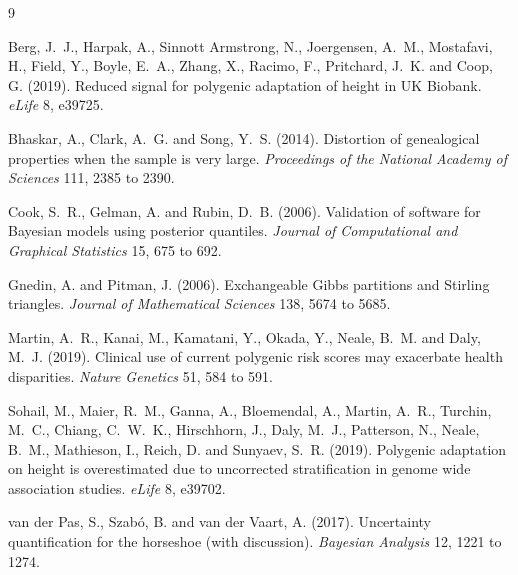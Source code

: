 \begin{thebibliography}{9}

Berg, J.~J., Harpak, A., Sinnott Armstrong, N., Joergensen, A.~M., Mostafavi, H., Field, Y.,
Boyle, E.~A., Zhang, X., Racimo, F., Pritchard, J.~K. and Coop, G. (2019). Reduced signal for
polygenic adaptation of height in UK Biobank. \emph{eLife} 8, e39725.

Bhaskar, A., Clark, A.~G. and Song, Y.~S. (2014). Distortion of genealogical properties when the
sample is very large. \emph{Proceedings of the National Academy of Sciences} 111, 2385 to 2390.

Cook, S.~R., Gelman, A. and Rubin, D.~B. (2006). Validation of software for Bayesian models using
posterior quantiles. \emph{Journal of Computational and Graphical Statistics} 15, 675 to 692.

Gnedin, A. and Pitman, J. (2006). Exchangeable Gibbs partitions and Stirling triangles.
\emph{Journal of Mathematical Sciences} 138, 5674 to 5685.

Martin, A.~R., Kanai, M., Kamatani, Y., Okada, Y., Neale, B.~M. and Daly, M.~J. (2019). Clinical
use of current polygenic risk scores may exacerbate health disparities. \emph{Nature Genetics} 51,
584 to 591.

Sohail, M., Maier, R.~M., Ganna, A., Bloemendal, A., Martin, A.~R., Turchin, M.~C., Chiang, C.~W.~K., Hirschhorn, J., Daly, M.~J., Patterson, N., Neale, B.~M., Mathieson, I., Reich, D. and Sunyaev, S.~R. (2019). Polygenic adaptation on height is overestimated due to uncorrected
stratification in genome wide association studies. \emph{eLife} 8, e39702.

van der Pas, S., Szab\'o, B. and van der Vaart, A. (2017). Uncertainty quantification for the
horseshoe (with discussion). \emph{Bayesian Analysis} 12, 1221 to 1274.

\end{thebibliography}
